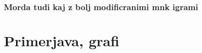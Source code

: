 \documentclass[12pt,a4paper]{amsart}
\theoremstyle{definition} %
\newtheorem{definicija}{Definicija}[section]
\theoremstyle{plain} %
\newtheorem{izrek}[definicija]{Izrek}
\newcommand{\R}{\mathbb R}
\begin{document}
\subsubsection{Morda tudi kaj z bolj modificranimi mnk igrami}

\section{Primerjava, grafi}







%
%
%
%
%
%
%
%
%
\end{document}
